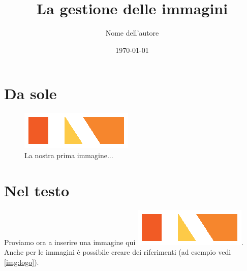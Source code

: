 \documentclass{article}
\author{Nome dell'autore}
\title{\textbf{La gestione delle immagini}}
\date{\today}
\begin{document}
\maketitle
\tableofcontents
\listoffigures


\section{Da sole}
\begin{figure}[h]
	\centering
	\includegraphics{AIM}
	\caption{La nostra prima immagine...}
	\label{img:logo}
\end{figure}

\section{Nel testo}
Proviamo ora a inserire una immagine qui \includegraphics{AIM}. Anche per le immagini è possibile creare dei riferimenti (ad esempio vedi \autoref{img:logo}).
\end{document}
